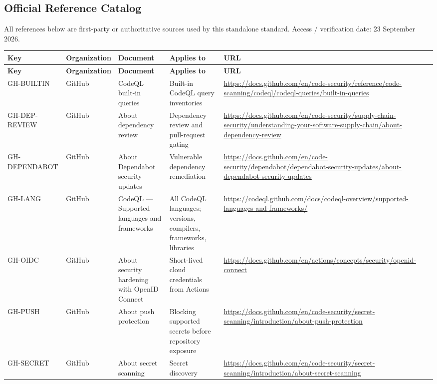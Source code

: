 \documentclass[10pt,letterpaper]{article}
\begin{document}
\begin{landscape}
\section{Official Reference Catalog}
All references below are first-party or authoritative sources used by this standalone standard. Access / verification date: 23 September 2026.

\scriptsize
\setlength{\tabcolsep}{3pt}
\begin{longtable}{@{}P{0.82in}P{1.23in}P{2.25in}P{1.7in}P{3.0in}@{}}
\toprule
\textbf{Key} & \textbf{Organization} & \textbf{Document} & \textbf{Applies to} & \textbf{URL}\\
\midrule
\endfirsthead
\toprule
\textbf{Key} & \textbf{Organization} & \textbf{Document} & \textbf{Applies to} & \textbf{URL}\\
\midrule
\endhead
GH-BUILTIN & GitHub & CodeQL built-in queries & Built-in CodeQL query inventories & \url{https://docs.github.com/en/code-security/reference/code-scanning/codeql/codeql-queries/built-in-queries}\\
GH-DEP-REVIEW & GitHub & About dependency review & Dependency review and pull-request gating & \url{https://docs.github.com/en/code-security/supply-chain-security/understanding-your-software-supply-chain/about-dependency-review}\\
GH-DEPENDABOT & GitHub & About Dependabot security updates & Vulnerable dependency remediation & \url{https://docs.github.com/en/code-security/dependabot/dependabot-security-updates/about-dependabot-security-updates}\\
GH-LANG & GitHub & CodeQL --- Supported languages and frameworks & All CodeQL languages; versions, compilers, frameworks, libraries & \url{https://codeql.github.com/docs/codeql-overview/supported-languages-and-frameworks/}\\
GH-OIDC & GitHub & About security hardening with OpenID Connect & Short-lived cloud credentials from Actions & \url{https://docs.github.com/en/actions/concepts/security/openid-connect}\\
GH-PUSH & GitHub & About push protection & Blocking supported secrets before repository exposure & \url{https://docs.github.com/en/code-security/secret-scanning/introduction/about-push-protection}\\
GH-SECRET & GitHub & About secret scanning & Secret discovery & \url{https://docs.github.com/en/code-security/secret-scanning/introduction/about-secret-scanning}\\

\end{longtable}
\end{landscape}
\end{document}

